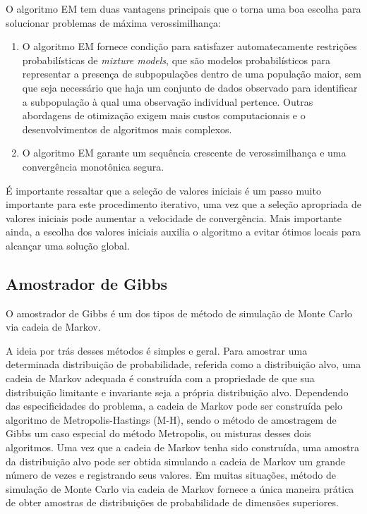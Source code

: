 \documentclass[
]{article}
\providecommand{\tightlist}{%
  \setlength{\itemsep}{0pt}\setlength{\parskip}{0pt}}
\begin{document}
O algoritmo EM tem duas vantagens principais que o torna uma boa escolha
para solucionar problemas de máxima verossimilhança:

\begin{enumerate}
\def\labelenumi{\arabic{enumi}.}
\tightlist
\item
  O algoritmo EM fornece condição para satisfazer automatecamente
  restrições probabilísticas de \emph{mixture models}, que são modelos
  probabilísticos para representar a presença de subpopulações dentro de
  uma população maior, sem que seja necessário que haja um conjunto de
  dados observado para identificar a subpopulação à qual uma observação
  individual pertence. Outras abordagens de otimização exigem mais
  custos computacionais e o desenvolvimentos de algoritmos mais
  complexos.
\item
  O algoritmo EM garante um sequência crescente de verossimilhança e uma
  convergência monotônica segura.
\end{enumerate}

É importante ressaltar que a seleção de valores iniciais é um passo
muito importante para este procedimento iterativo, uma vez que a seleção
apropriada de valores iniciais pode aumentar a velocidade de
convergência. Mais importante ainda, a escolha dos valores iniciais
auxilia o algoritmo a evitar ótimos locais para alcançar uma solução
global.

\hypertarget{amostrador-de-gibbs}{%
\subsection{Amostrador de Gibbs}\label{amostrador-de-gibbs}}

O amostrador de Gibbs é um dos tipos de método de simulação de Monte
Carlo via cadeia de Markov.

A ideia por trás desses métodos é simples e geral. Para amostrar uma
determinada distribuição de probabilidade, referida como a distribuição
alvo, uma cadeia de Markov adequada é construída com a propriedade de
que sua distribuição limitante e invariante seja a própria distribuição
alvo. Dependendo das especificidades do problema, a cadeia de Markov
pode ser construída pelo algoritmo de Metropolis-Hastings (M-H), sendo o
método de amostragem de Gibbs um caso especial do método Metropolis, ou
misturas desses dois algoritmos. Uma vez que a cadeia de Markov tenha
sido construída, uma amostra da distribuição alvo pode ser obtida
simulando a cadeia de Markov um grande número de vezes e registrando
seus valores. Em muitas situações, método de simulação de Monte Carlo
via cadeia de Markov fornece a única maneira prática de obter amostras
de distribuições de probabilidade de dimensões superiores.
\end{document}
